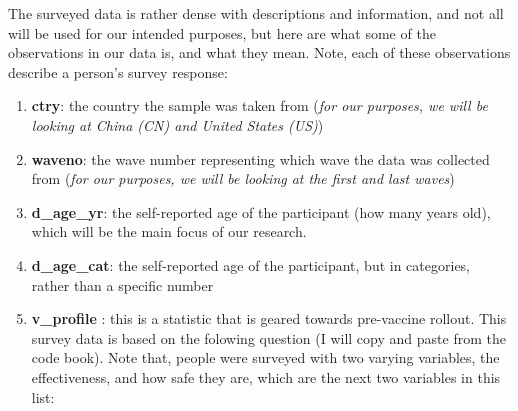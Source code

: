 \documentclass[
]{article}
\providecommand{\tightlist}{%
  \setlength{\itemsep}{0pt}\setlength{\parskip}{0pt}}
\begin{document}
The surveyed data is rather dense with descriptions and information, and
not all will be used for our intended purposes, but here are what some
of the observations in our data is, and what they mean. Note, each of
these observations describe a person's survey response:

\begin{enumerate}
\def\labelenumi{\arabic{enumi}.}
\tightlist
\item
  \textbf{ctry}: the country the sample was taken from (\emph{for our
  purposes, we will be looking at China (CN) and United States (US)})
\item
  \textbf{waveno}: the wave number representing which wave the data was
  collected from (\emph{for our purposes, we will be looking at the
  first and last waves})
\item
  \textbf{d\_age\_yr}: the self-reported age of the participant (how
  many years old), which will be the main focus of our research.
\item
  \textbf{d\_age\_cat}: the self-reported age of the participant, but in
  categories, rather than a specific number
\item
  \textbf{v\_profile} : this is a statistic that is geared towards
  pre-vaccine rollout. This survey data is based on the folowing
  question (I will copy and paste from the code book). Note that, people
  were surveyed with two varying variables, the effectiveness, and how
  safe they are, which are the next two variables in this list:


\end{enumerate}
\end{document}
